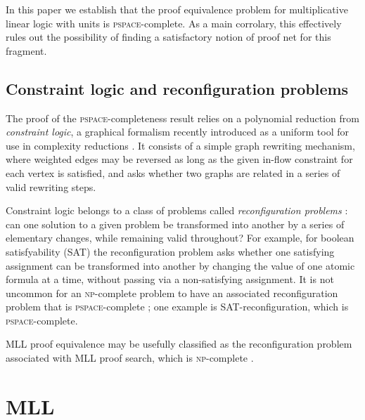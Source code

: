 \documentclass[conference]{IEEEtran}
\begin{document}
In this paper we establish that the proof equivalence problem for multiplicative linear logic with units is \textsc{pspace}-complete.
%
As a main corrolary, this effectively rules out the possibility of finding a satisfactory notion of proof net for this fragment.



\subsection*{Constraint logic and reconfiguration problems}

The proof of the \textsc{pspace}-completeness result relies on a polynomial reduction from %
\emph{constraint logic}, a graphical formalism recently introduced as a uniform tool for use in complexity reductions \cite{Demaine-Hearn-2008}.
%
It consists of a simple graph rewriting mechanism, where weighted edges may be reversed as long as the given in-flow constraint for each vertex is satisfied, and asks whether two graphs are related in a series of valid rewriting steps.



Constraint logic belongs to a class of problems called \emph{reconfiguration problems} \cite{ReconfigurationProblems}: can one solution to a given problem be transformed into another by a series of elementary changes, while remaining valid throughout?
%
For example, for boolean satisfyability (SAT) the reconfiguration problem asks whether one satisfying assignment can be transformed into another by changing the value of one atomic formula at a time, without passing via a non-satisfying assignment.
%
It is not uncommon for an \textsc{np}-complete problem to have an associated reconfiguration problem that is \textsc{pspace}-complete \cite{ReconfigurationProblems}; one example is SAT-reconfiguration, which is \textsc{pspace}-complete.



MLL proof equivalence may be usefully classified as the reconfiguration problem associated with MLL proof search, which is \textsc{np}-complete \cite{Kanovich-1992}.





\section{MLL}
\end{document}
